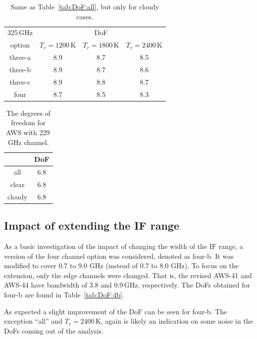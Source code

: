 \documentclass[12pt]{article}
\begin{document}
\begin{table}[!p]
	\centering
	\begin{tabular}[b]{c|c|c|c}
	325\,GHz & \multicolumn{3}{c}{DoF}   \\
	option &  $T_r = 1200 $\,K &   $T_r = 1800 $\,K &   $T_r = 2400$\,K \\
		\hline
		three-a &              8.9 &              8.7 &              8.5 \\		
		three-b &              8.9 &              8.7 &              8.6 \\		
		three-c &              8.9 &              8.8 &              8.7 \\		
		four    &              8.7 &              8.5 &              8.3 \\
		\hline
	\end{tabular}
	\caption{Same as Table~\ref{tab:DoF:all}, but only for cloudy cases.  }
	\label{tab:DoF:cloudy}
\end{table}

\begin{table}[!p]
	\centering
	\begin{tabular}[b]{c|c}
		&   DoF \\
		\hline
		all    &      6.8        \\
		clear  &      6.8        \\
		cloudy &      6.8        \\
		\hline
	\end{tabular}
	\caption{The degrees of freedom for AWS with 229\,GHz channel. }
	\label{tab:DoF:4X}
\end{table}


\subsection{Impact of extending the IF range}
%
As a basic investigation of the impact of changing the width of the IF range, a
version of the four channel option was considered, denoted as four-b. It was
modified to cover 0.7 to 9.0 GHz (instead of 0.7 to 8.0 GHz). To focus on the
extension, only the edge channels were changed. That is, the revised AWS-41 and AWS-44
have bandwidth of 3.8 and 0.9\,GHz, respectively. The DoFs obtained for four-b
are found in Table~\ref{tab:DoF:4b}.

As expected a slight improvement of the DoF can be seen for four-b. The
exception ``all'' and $T_r=2400$\,K, again is likely an indication on some noise
in the DoFs coming out of the analysis.
\end{document}
